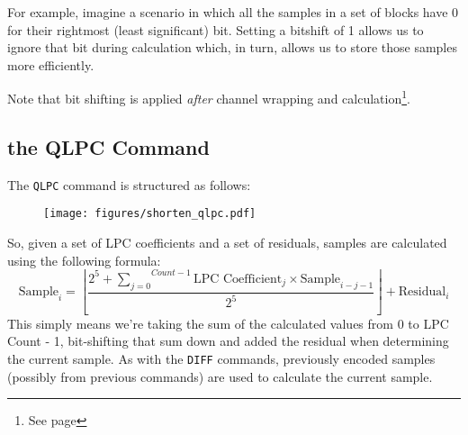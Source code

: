 For example, imagine a scenario in which all the samples in a set of
blocks have 0 for their rightmost (least significant) bit.
Setting a bitshift of 1 allows us to ignore that bit during
calculation which, in turn, allows us to store those samples more
efficiently.

Note that bit shifting is applied \textit{after} channel wrapping
and  calculation\footnote{See page \pageref{shorten_coffset}}.

\pagebreak

\subsection{the QLPC Command}

The \texttt{QLPC} command is structured as follows:

\begin{figure}[h]
\texttt{[image: figures/shorten\_qlpc.pdf]}
\end{figure}
\par
\noindent
So, given a set of LPC coefficients and a set of residuals,
samples are calculated using the following formula:
\begin{equation}
\text{Sample}_i = \left\lfloor \frac{2 ^ 5 + \overset{Count - 1}{\underset{j = 0}{\sum}}
  \text{LPC Coefficient}_j \times \text{Sample}_{i - j - 1} } {2 ^ 5}\right\rfloor + \text{Residual}_i
\end{equation}
This simply means we're taking the sum of the calculated values from
0 to LPC Count - 1, bit-shifting that sum down and added the residual
when determining the current sample.
As with the \texttt{DIFF} commands, previously encoded samples
(possibly from previous commands) are used to calculate the current
sample.

